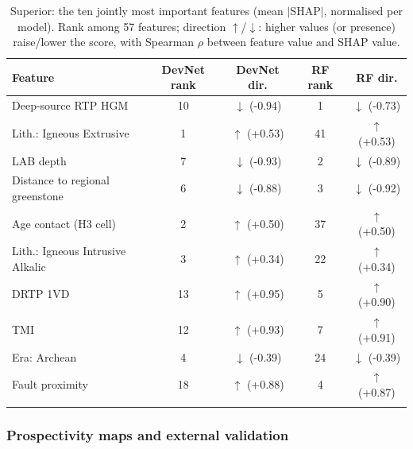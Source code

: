 \documentclass[pdflatex,sn-apa]{sn-jnl}
\begin{document}
\begin{table}[t]
\caption{Superior: the ten jointly most important features (mean $|$SHAP$|$, normalised per model). Rank among 57 features; direction $\uparrow$/$\downarrow$: higher values (or presence) raise/lower the score, with Spearman $\rho$ between feature value and SHAP value.}\label{tab:shap}
\scriptsize
\setlength{\tabcolsep}{2.5pt}
\begin{tabular*}{\textwidth}{@{\extracolsep\fill}lcccc}
\toprule
Feature & DevNet rank & DevNet dir. & RF rank & RF dir. \\
\midrule
Deep-source RTP HGM & 10 & $\downarrow$ (-0.94) & 1 & $\downarrow$ (-0.73) \\
Lith.: Igneous Extrusive & 1 & $\uparrow$ (+0.53) & 41 & $\uparrow$ (+0.53) \\
LAB depth & 7 & $\downarrow$ (-0.93) & 2 & $\downarrow$ (-0.89) \\
Distance to regional greenstone & 6 & $\downarrow$ (-0.88) & 3 & $\downarrow$ (-0.92) \\
Age contact (H3 cell) & 2 & $\uparrow$ (+0.50) & 37 & $\uparrow$ (+0.50) \\
Lith.: Igneous Intrusive Alkalic & 3 & $\uparrow$ (+0.34) & 22 & $\uparrow$ (+0.34) \\
DRTP 1VD & 13 & $\uparrow$ (+0.95) & 5 & $\uparrow$ (+0.90) \\
TMI & 12 & $\uparrow$ (+0.93) & 7 & $\uparrow$ (+0.91) \\
Era: Archean & 4 & $\downarrow$ (-0.39) & 24 & $\downarrow$ (-0.39) \\
Fault proximity & 18 & $\uparrow$ (+0.88) & 4 & $\uparrow$ (+0.87) \\
\botrule
\end{tabular*}
\end{table}

\subsubsection{Prospectivity maps and external validation}\label{sec:res-maps}
\end{document}

